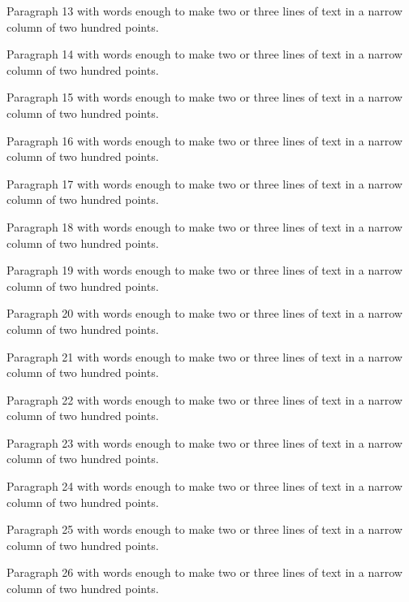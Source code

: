 Paragraph 13 with words enough to make two or three lines of text in a narrow column of two hundred points.\par{} \vbox{}
Paragraph 14 with words enough to make two or three lines of text in a narrow column of two hundred points.\par{} \vbox{}
Paragraph 15 with words enough to make two or three lines of text in a narrow column of two hundred points.\par{} \vbox{}
Paragraph 16 with words enough to make two or three lines of text in a narrow column of two hundred points.\par{} \vbox{}
Paragraph 17 with words enough to make two or three lines of text in a narrow column of two hundred points.\par{} \vbox{}
Paragraph 18 with words enough to make two or three lines of text in a narrow column of two hundred points.\par{} \vbox{}
Paragraph 19 with words enough to make two or three lines of text in a narrow column of two hundred points.\par{} \vbox{}
Paragraph 20 with words enough to make two or three lines of text in a narrow column of two hundred points.\par{} \vbox{}
Paragraph 21 with words enough to make two or three lines of text in a narrow column of two hundred points.\par{} \vbox{}
Paragraph 22 with words enough to make two or three lines of text in a narrow column of two hundred points.\par{} \vbox{}
Paragraph 23 with words enough to make two or three lines of text in a narrow column of two hundred points.\par{} \vbox{}
Paragraph 24 with words enough to make two or three lines of text in a narrow column of two hundred points.\par{} \vbox{}
Paragraph 25 with words enough to make two or three lines of text in a narrow column of two hundred points.\par{} \vbox{}
Paragraph 26 with words enough to make two or three lines of text in a narrow column of two hundred points.\par{} \vbox{}
